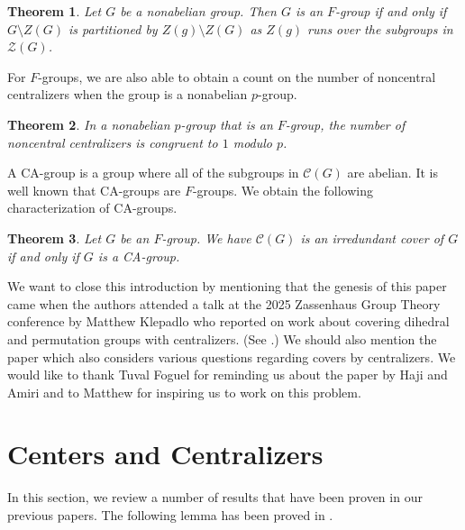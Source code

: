 \documentclass[12pt]{amsart}
\newtheorem{thm}{Theorem}
\begin{document}
{\begin{thm} \label{intro F-group partition}
Let $G$ be a nonabelian group.  Then $G$ is an $F$-group if and only if $G \setminus Z(G)$ is partitioned by $Z(g) \setminus Z(G)$ as $Z(g)$ runs over the subgroups in $\mathcal{Z} (G)$.	
\end{thm}

For $F$-groups, we are also able to obtain a count on the number of noncentral centralizers when the group is a nonabelian $p$-group.

\begin{thm} \label{intro $F$-group $p$-group}
In a nonabelian $p$-group that is an $F$-group, the number of noncentral centralizers is congruent to $1$ modulo $p$.     
\end{thm}

A CA-group is a group where all of the subgroups in $\mathcal {C} (G)$ are abelian.  It is well known that CA-groups are $F$-groups.  We obtain the following characterization of CA-groups.

\begin{thm}\label{intro thm:CA}
Let $G$ be an $F$-group.  We have $\mathcal {C} (G)$ is an irredundant cover of $G$ if and only if $G$ is a CA-group.
\end{thm}

We want to close this introduction by mentioning that the genesis of this paper came when the authors attended a talk at the 2025 Zassenhaus Group Theory conference by Matthew Klepadlo who reported on work about covering dihedral and permutation groups with centralizers.  (See \cite{zass}.)  We should also mention the paper \cite{HaAm} which also considers various questions regarding covers by centralizers.  We would like to thank Tuval Foguel for reminding us about the paper by Haji and Amiri and to Matthew for inspiring us to work on this problem.

\section {Centers and Centralizers}


In this section, we review a number of results that have been proven in our previous papers.  The following lemma has been proved in \cite{max abel}.

}
\end{document}
